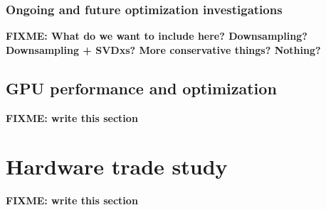 \documentclass{article}
\begin{document}
\subsubsection{Ongoing and future optimization investigations}
\label{sec:ongo-future-optim}

\textbf{FIXME: What do we want to include here?  Downsampling? Downsampling +
  SVDxs?  More conservative things?  Nothing?}

\subsection{GPU performance and optimization}
\label{sec:gpu-perf-optim}

\textbf{FIXME: write this section}

\section{Hardware trade study}
\label{sec:hardware-study}

\textbf{FIXME: write this section}
\end{document}
